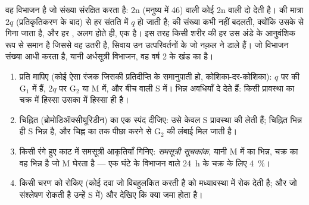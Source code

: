 \begin{proposition}\label{prop:b1:replication-mitosis:conserves}
 वह विभाजन है जो  संख्या संरक्षित करता है: 2n
 (मनुष्य में 46) वाली कोई  2n वाली दो  देती है।
 की मात्रा $2q$ (प्रतिकृतिकरण के बाद) से हर संतति में $q$ हो जाती है;
 की संख्या कभी नहीं बदलती, क्योंकि  उसके  से
गिना जाता है, और हर , अलग होते ही, एक  है। इस तरह किसी
शरीर की हर  उस अंडे के आनुवंशिक रूप से समान है जिससे वह उतरी है,
सिवाय उन उत्परिवर्तनों के जो नक़ल ने डाले हैं। जो विभाजन  संख्या
आधी करता है, यानी अर्धसूत्री विभाजन, वह वर्ष 2 के खंड का है।
\end{proposition}

\begin{method}[किसी कोशिका-चक्र प्रयोग को पढ़ना]\label{met:b1:replication-mitosis:reading}
\begin{enumerate}
  \item प्रति   मापिए (कोई ऐसा रंजक जिसकी प्रतिदीप्ति  के
        समानुपाती हो, कोशिका-दर-कोशिका): $q$ पर की  G$_1$ में
        हैं, $2q$ पर G$_2$ या M में, और बीच वाली S में। भिन्न अवधियाँ
        दे देते हैं: किसी प्रावस्था का चक्र में हिस्सा उसका  में
        हिस्सा ही है।
  \item चिह्नित  (ब्रोमोडिऑक्सीयूरिडीन) का एक स्पंद दीजिए:
        उसे केवल S प्रावस्था की  लेती हैं; चिह्नित भिन्न ही
        S भिन्न है, और चिह्न का  तक पीछा करने से G$_2$ की
        लंबाई मिल जाती है।
  \item किसी रंगे हुए काट में समसूत्री आकृतियाँ गिनिए: \emph{समसूत्री
        सूचकांक}, यानी M में  का भिन्न, चक्र का वह भिन्न है जो M
        घेरता है --- एक घंटे के विभाजन वाले \qty{24}{h} के चक्र के लिए
        \qty{4}{\%}।
  \item किसी चरण को रोकिए (कोई दवा जो  विबहुलकित करती है
         को मध्यावस्था में रोक देती है; और जो  संश्लेषण रोकती
        है उन्हें S में) और देखिए कि क्या जमा होता है।
\end{enumerate}
\end{method}

